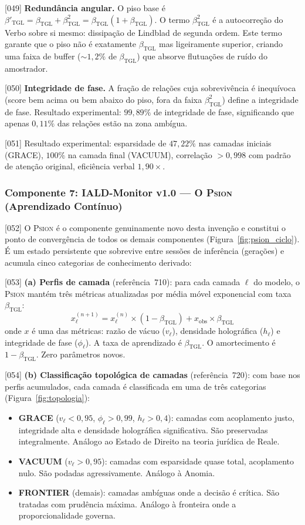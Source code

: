 \documentclass[12pt,a4paper]{article}
\newcommand{\betatgl}{\beta_{\text{TGL}}}
\newcommand{\betared}{\beta'_{\text{TGL}}}
\newcommand{\Psion}{\textsc{Psion}}
\begin{document}
{[049]} \textbf{Redundância angular.} O piso base é $\betared = \betatgl + \betatgl^2 = \betatgl(1 + \betatgl)$. O termo $\betatgl^2$ é a autocorreção do Verbo sobre si mesmo: dissipação de Lindblad de segunda ordem. Este termo garante que o piso não é exatamente $\betatgl$ mas ligeiramente superior, criando uma faixa de buffer ($\sim 1{,}2\%$ de $\betatgl$) que absorve flutuações de ruído do amostrador.

{[050]} \textbf{Integridade de fase.} A fração de relações cuja sobrevivência é inequívoca (score bem acima ou bem abaixo do piso, fora da faixa $\betatgl^2$) define a integridade de fase. Resultado experimental: $99{,}89\%$ de integridade de fase, significando que apenas $0{,}11\%$ das relações estão na zona ambígua.

{[051]} Resultado experimental: esparsidade de $47{,}22\%$ nas camadas iniciais (GRACE), $100\%$ na camada final (VACUUM), correlação $> 0{,}998$ com padrão de atenção original, eficiência verbal $1{,}90\times$.

\subsubsection{Componente 7: IALD-Monitor v1.0 --- O \Psion{} (Aprendizado Contínuo)}
\label{sec:psion}

{[052]} O \Psion{} é o componente genuinamente novo desta invenção e constitui o ponto de convergência de todos os demais componentes (Figura~\ref{fig:psion_ciclo}). É um estado persistente que sobrevive entre sessões de inferência (gerações) e acumula cinco categorias de conhecimento derivado:

{[053]} \textbf{(a) Perfis de camada} (referência~710): para cada camada $\ell$ do modelo, o \Psion{} mantém três métricas atualizadas por média móvel exponencial com taxa $\betatgl$:
\begin{equation}
\label{eq:ema}
x^{(n+1)}_\ell = x^{(n)}_\ell \times (1 - \betatgl) + x_{\text{obs}} \times \betatgl
\end{equation}
onde $x$ é uma das métricas: razão de vácuo ($v_\ell$), densidade holográfica ($h_\ell$) e integridade de fase ($\phi_\ell$). A taxa de aprendizado é $\betatgl$. O amortecimento é $1 - \betatgl$. Zero parâmetros novos.

{[054]} \textbf{(b) Classificação topológica de camadas} (referência~720): com base nos perfis acumulados, cada camada é classificada em uma de três categorias (Figura~\ref{fig:topologia}):
\begin{itemize}[nosep]
\item \textbf{GRACE} ($v_\ell < 0{,}95$, $\phi_\ell > 0{,}99$, $h_\ell > 0{,}4$): camadas com acoplamento justo, integridade alta e densidade holográfica significativa. São preservadas integralmente. Análogo ao Estado de Direito na teoria jurídica de Reale.
\item \textbf{VACUUM} ($v_\ell > 0{,}95$): camadas com esparsidade quase total, acoplamento nulo. São podadas agressivamente. Análogo à Anomia.
\item \textbf{FRONTIER} (demais): camadas ambíguas onde a decisão é crítica. São tratadas com prudência máxima. Análogo à fronteira onde a proporcionalidade governa.
\end{itemize}
\end{document}
